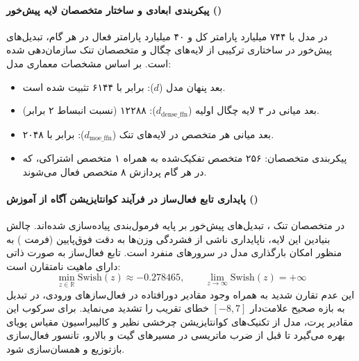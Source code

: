 \item {}

\paragraph*{پیکربندی ابعادی و ساختار متخصصان لایه پیش‌خور ()}
در مدل  \cite{glm2025glm5} با ۷۴۴ میلیارد پارامتر کل و ۴۰ میلیارد پارامتر فعال در هر گام، تبدیل‌های پیش‌خور در ساختاری ترکیبی از لایه‌های چگال و متخصصان تنک سازمان‌دهی شده است. بر اساس مشخصات معماری مدل:
\begin{itemize}
    \item بعد پنهان مدل ($d$): برابر با ۶۱۴۴ تثبیت شده است.
    \item بعد میانی در ۳ لایه چگال اولیه ($d_{\text{dense\_ffn}}$): ۱۲۲۸۸ (نسبت انبساط ۲ برابر).
    \item بعد میانی هر متخصص در لایه‌های تنک ($d_{\text{moe\_ffn}}$): برابر با ۲۰۴۸.
    \item پیکربندی متخصصان: ۲۵۶ متخصص تفکیک‌شده به همراه ۱ متخصص اشتراکی، که در هر گام پردازش ۸ متخصص فعال می‌شوند.
\end{itemize}

\paragraph*{پایداری تابع فعال‌ساز در فرآیند کوانتایزیشن آگاه از آموزش ()}
در متخصصان تنک ، تبدیل‌های پیش‌خور بر پایه فرمول‌بندی  پیاده‌سازی شده‌اند. چالش بنیادین این لایه، ناپایداری ناشی از فشردگی وزن‌ها به دقت فوق‌پایین  (فرمت ) به منظور امکان بارگذاری مدل در سرورهای منفرد است. تابع فعال‌ساز  به صورت ذاتی دارای ماهیت نامتقارن است:
\begin{equation}
    \min_{z \in \mathbb{R}} \text{Swish}(z) \approx -0.278465, \qquad \lim_{z \to \infty} \text{Swish}(z) = +\infty
\end{equation}
این عدم تقارن شدید به همراه وجود مقادیر دورافتاده در فعال‌سازهای ورودی، در تبدیل به بازه صحیح علامت‌دار $[-8, 7]$ خطای تقریب را تشدید می‌نماید. برای سرکوب این مقادیر پرت، مدل از تکنیک‌های کوانتایزیشن چرخشی نظیر  و کالیبراسیون مقیاس پویای  بهره می‌گیرد تا قبل از ضرب ماتریسی در مسیرهای گیت و بالارو، تانسور فعال‌سازی بازتوزیع و همسان‌سازی شود.

